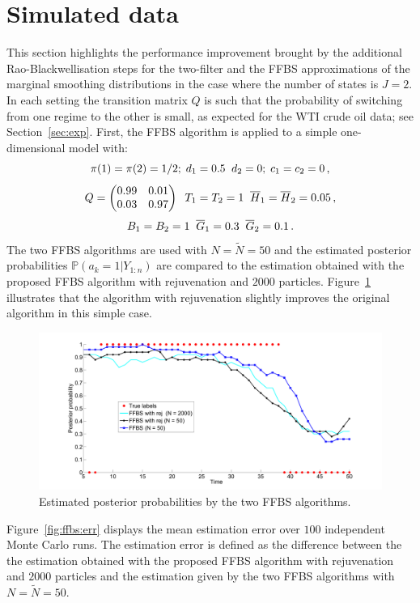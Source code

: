 \section{Simulated data}
\label{sec:numerical:experiments}
This section highlights the performance improvement brought by  the additional Rao-Blackwellisation steps for the two-filter and the FFBS approximations of the marginal smoothing distributions in the case where the number of states is $J=2$. In each setting the transition matrix $Q$ is such that the probability of switching from one regime to the other is small, as expected for the WTI crude oil data;  see Section~\ref{sec:exp}. First, the FFBS algorithm is applied to a simple one-dimensional model with:
\[
\pi(1)=\pi(2) = 1/2\\;\;d_1 = 0.5\;\; d_2 = 0;\;c_1= c_2 = 0 \,,
\]
\[
Q = \begin{pmatrix}0.99 & 0.01\\ 0.03 & 0.97\end{pmatrix}\;\;T_1 = T_2 = 1\;\;\overline{H}_1 = \overline{H}_2= 0.05\,,
\]
\[
B_1 = B_2 =1\;\;\overline{G}_1 = 0.3\;\;\overline{G}_2 = 0.1\,.
\]
The two FFBS algorithms are used with $N = \tilde{N} = 50$ and the estimated posterior probabilities $\mathbb{P}(a_k=1|Y_{1:n})$ are compared to the estimation obtained with the proposed FFBS algorithm with rejuvenation and $2000$ particles. Figure~\ref{fig:ffbs:posterior} illustrates that the algorithm with rejuvenation slightly improves the original algorithm in this simple case.
\begin{figure}
\centering
\includegraphics[scale=.3]{FFBSplot}
\caption{Estimated posterior probabilities by the two FFBS algorithms.}
\label{fig:ffbs:posterior}
\end{figure}
Figure~\ref{fig:ffbs:err} displays the mean estimation error over $100$ independent Monte Carlo runs. The estimation error is defined as the difference between the the estimation obtained with the proposed FFBS algorithm with rejuvenation and $2000$ particles and the estimation given by the two FFBS algorithms with $N = \tilde{N} = 50$.

